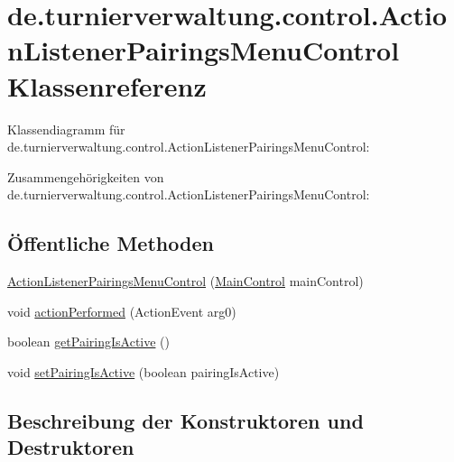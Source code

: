 \hypertarget{classde_1_1turnierverwaltung_1_1control_1_1_action_listener_pairings_menu_control}{}\section{de.\+turnierverwaltung.\+control.\+Action\+Listener\+Pairings\+Menu\+Control Klassenreferenz}
\label{classde_1_1turnierverwaltung_1_1control_1_1_action_listener_pairings_menu_control}


Klassendiagramm für de.\+turnierverwaltung.\+control.\+Action\+Listener\+Pairings\+Menu\+Control\+:


Zusammengehörigkeiten von de.\+turnierverwaltung.\+control.\+Action\+Listener\+Pairings\+Menu\+Control\+:
\subsection*{Öffentliche Methoden}
\begin{DoxyCompactItemize}
\item 
\hyperlink{classde_1_1turnierverwaltung_1_1control_1_1_action_listener_pairings_menu_control_ad10800f9ebfcfa2a0d694a1531415874}{Action\+Listener\+Pairings\+Menu\+Control} (\hyperlink{classde_1_1turnierverwaltung_1_1control_1_1_main_control}{Main\+Control} main\+Control)
\item 
void \hyperlink{classde_1_1turnierverwaltung_1_1control_1_1_action_listener_pairings_menu_control_af69ee7632cbebc898ec6d98309958f36}{action\+Performed} (Action\+Event arg0)
\item 
boolean \hyperlink{classde_1_1turnierverwaltung_1_1control_1_1_action_listener_pairings_menu_control_a2383fc45e990dc2aa9ac4a8ca00f8d72}{get\+Pairing\+Is\+Active} ()
\item 
void \hyperlink{classde_1_1turnierverwaltung_1_1control_1_1_action_listener_pairings_menu_control_a14f58dc33ceb108abba63dd99e18528b}{set\+Pairing\+Is\+Active} (boolean pairing\+Is\+Active)
\end{DoxyCompactItemize}


\subsection{Beschreibung der Konstruktoren und Destruktoren}
